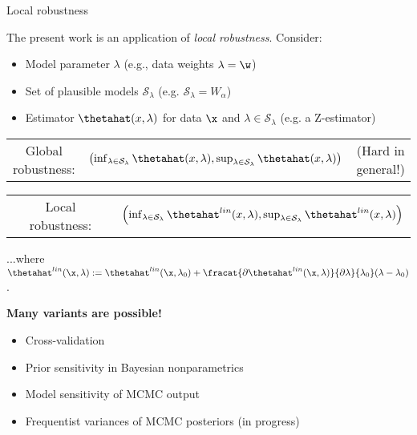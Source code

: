 \begin{frame}{Local robustness}

The present work is an application of {\em local robustness}.  Consider:
%
\begin{itemize}
%
\item Model parameter $\lambda$  (e.g., data weights $\lambda = \w$)
\item Set of plausible models $\mathcal{S}_\lambda$
    (e.g. $\mathcal{S}_\lambda = W_\alpha$)
\item Estimator $\thetahat(x, \lambda)$ for data $\x$ and
    $\lambda \in \mathcal{S}_\lambda$
    (e.g. a Z-estimator)
%
\end{itemize}
%

\hrulefill

\begin{tabular}{ccc}
    Global robustness:   &
%
$
\left(
\inf_{\lambda \in \mathcal{S}_\lambda} \thetahat(x, \lambda),
\sup_{\lambda \in \mathcal{S}_\lambda} \thetahat(x, \lambda)
\right)
$
& (Hard in general!)
\end{tabular}


\hrulefill

\begin{tabular}{cc}
Local robustness:
&
$
\left(
\inf_{\lambda \in \mathcal{S}_\lambda} \thetahat^{lin}(x, \lambda),
\sup_{\lambda \in \mathcal{S}_\lambda} \thetahat^{lin}(x, \lambda)
\right)
$
%
\end{tabular}

...where $\thetahat^{lin}(\x, \lambda) :=
\thetahat^{lin}(\x, \lambda_0) +
    \fracat{\partial \thetahat^{lin}(\x, \lambda)}{\partial \lambda}{\lambda_0}
        (\lambda  - \lambda_0)$.

\hrulefill

\textbf{Many variants are possible!}

\begin{itemize}
    \item Cross-validation \citep{giordano2019swiss}
    \item Prior sensitivity in Bayesian nonparametrics \citep{giordano2021bnp}
    \item Model sensitivity of MCMC output \citep{giordano2018covariances}
    \item Frequentist variances of MCMC posteriors (in progress)
\end{itemize}


\end{frame}


